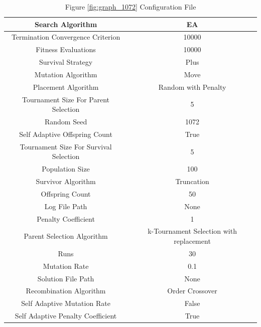 \documentclass{standalone}
\begin{document}
\begin{table}[!htb]
	\centering
	\caption{Figure \ref{fig:graph_1072} Configuration File}
	\label{tab:graph_1072}
	\begin{tabular}{| c | c |}
		\hline
		Search Algorithm		& EA		 \\
		\hline
		Termination Convergence Criterion		& 10000		 \\
		\hline
		Fitness Evaluations		& 10000		 \\
		\hline
		Survival Strategy		& Plus		 \\
		\hline
		Mutation Algorithm		& Move		 \\
		\hline
		Placement Algorithm		& Random with Penalty		 \\
		\hline
		Tournament Size For Parent Selection		& 5		 \\
		\hline
		Random Seed		& 1072		 \\
		\hline
		Self Adaptive Offspring Count		& True		 \\
		\hline
		Tournament Size For Survival Selection		& 5		 \\
		\hline
		Population Size		& 100		 \\
		\hline
		Survivor Algorithm		& Truncation		 \\
		\hline
		Offspring Count		& 50		 \\
		\hline
		Log File Path		& None		 \\
		\hline
		Penalty Coefficient		& 1		 \\
		\hline
		Parent Selection Algorithm		& k-Tournament Selection with replacement		 \\
		\hline
		Runs		& 30		 \\
		\hline
		Mutation Rate		& 0.1		 \\
		\hline
		Solution File Path		& None		 \\
		\hline
		Recombination Algorithm		& Order Crossover		 \\
		\hline
		Self Adaptive Mutation Rate		& False		 \\
		\hline
		Self Adaptive Penalty Coefficient		& True		 \\
		\hline
	\end{tabular}
\end{table}
\end{document}
